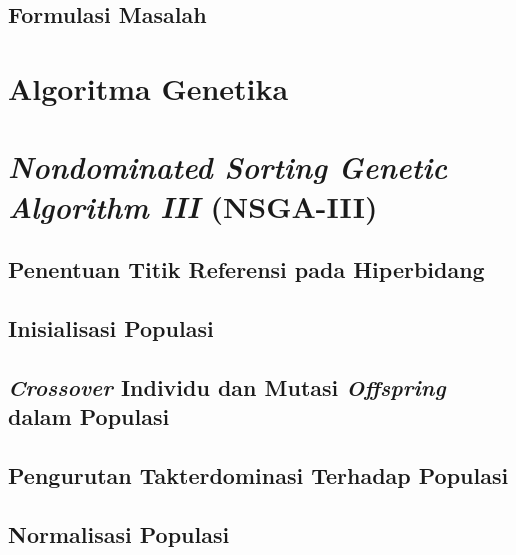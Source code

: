 \documentclass[ugmskripsi]{ugmskripsi}
\begin{document}
		\subsection{Formulasi Masalah}
		\label{formulasi masalah routing}
		
		
	
	\section{Algoritma Genetika}
	\label{GA}
	
	
	\section{\textit{Nondominated Sorting Genetic Algorithm III} (NSGA-III)}
	\label{NSGA3}
	
	
		\subsection{Penentuan Titik Referensi pada Hiperbidang}
		\label{titik referensi}
		

		\subsection{Inisialisasi Populasi}
		\label{titik referensi}
		

		\subsection{\textit{Crossover} Individu dan Mutasi \textit{Offspring} dalam Populasi}
		\label{titik referensi}
		

		\subsection{Pengurutan Takterdominasi Terhadap Populasi}
			\label{nondominated sorting}
			

		\subsection{Normalisasi Populasi}
			\label{normalisasi populasi}
			
			
\end{document}
